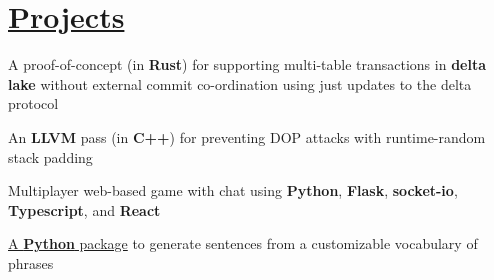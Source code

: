 
\section{\href{https://naveen-u.github.io/projects/}{Projects}}
\resumeItemListStart

{A proof-of-concept (in \textbf{Rust}) for supporting multi-table transactions in \textbf{delta lake} without external commit co-ordination using just updates to the delta protocol}

{An \textbf{LLVM} pass (in \textbf{C++}) for preventing DOP attacks with runtime-random stack padding}

{Multiplayer web-based game with chat using \textbf{Python}, \textbf{Flask}, \textbf{socket-io}, \textbf{Typescript}, and \textbf{React}}


{\href{https://pypi.org/project/nabg/}{A \textbf{Python} package} to generate sentences from a customizable vocabulary of phrases}



\resumeItemListEnd